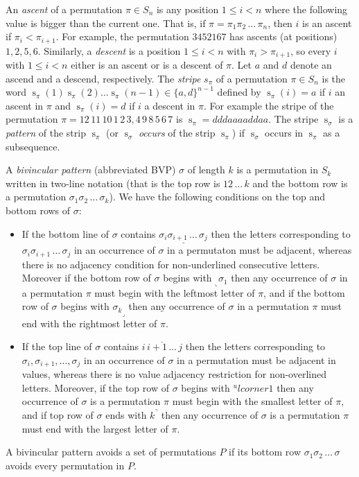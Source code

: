 \documentclass[a4paper]{llncs}
\DeclareMathOperator{\stripea}{s}
\newcommand{\stripe}[2]{\stripea_{{#1}}({#2})}
\newcommand{\stripew}[1]{\stripea_{{#1}}}
\newcommand{\dstep}{d}
\newcommand{\ustep}{a}
\begin{document}
An \emph{ascent} of a permutation $\pi \in S_n$ is any position 
$1 \leq i < n$ where the following value is bigger than the current one. 
That is, if $\pi = \pi_1\pi_2\,\ldots\,\pi_n$, then
$i$ is an ascent if $\pi_i < \pi_{i+1}$.
For example, the permutation 
$345216$7 has ascents (at positions) $1,2,5,6$.
Similarly, a \emph{descent} is a position 
$1 \leq i < n$ with $\pi_i > \pi_{i+1}$, 
so every $i$ with $1 \leq i < n$ either is an ascent or is a descent of 
$\pi$.
Let $\ustep$ and $\dstep$ denote an ascend and a descend, respectively.
The \emph{stripe} $s_\pi$ of a permutation $\pi \in S_n$ is the word
$\stripe{\pi}{1} \stripe{\pi}{2} \ldots \stripe{\pi}{n-1} \in \{\ustep,\dstep\}^{n-1}$ 
defined by 
$ \stripe{\pi}{i}= \ustep$ if $i$ an ascent in $\pi$ and
$\stripe{\pi}{i} = \dstep$ if $i$ a descent in $\pi$.
For example the stripe of the permutation 
$\pi = 12\,11\,10\,1\,2\,3,4\,9\,8\,5\,6\,7$ 
is 
$\stripew{\pi} = \dstep\dstep\dstep\ustep\ustep\ustep\ustep\dstep\dstep\ustep\ustep$.
The stripe $\stripew{\sigma}$ is a \emph{pattern} of the strip $\stripew{\pi}$
(or $\stripew{\sigma}$ \emph{occurs} of the strip $\stripew{\pi}$) if $\stripew{\sigma}$ occurs in
$\stripew{\pi}$ as a subsequence.
			
A \emph{bivincular pattern} (abbreviated BVP) $\sigma$
of length $k$ is a permutation in $S_k$ written in
two-line notation 
(that is the top row is $12\,\ldots\,k$ and the bottom row
is a permutation $\sigma_1\sigma_2\,\ldots\,\sigma_k$).
We have the following conditions on the top and bottom rows
of $\sigma$:
\begin{itemize}
	\item
	If the bottom line of $\sigma$ contains
	$\underline{\sigma_i\sigma_{i+1}\,\ldots\,\sigma_j}$
	then the letters corresponding to 
	$\sigma_i\sigma_{i+1}\,\ldots\,\sigma_j$ in an occurrence of
	$\sigma$ in a permutaton must be adjacent, whereas there is
	no adjacency condition for
	non-underlined consecutive letters.
	Moreover if the bottom row of $\sigma$ begins with
	$_\llcorner{\sigma_1}$ then any occurrence of $\sigma$ 
	in a permutation $\pi$ must begin with the leftmost 
	letter of $\pi$,
	and 
	if the bottom row of $\sigma$ begins with
	${\sigma_k}_\lrcorner$ then any occurrence of $\sigma$ 
	in a permutation $\pi$ must end with the rightmost 
	letter of $\pi$.
	\item
	If the top line of $\sigma$ contains
	$\overline{i\,i+1\,\ldots\,j}$ then the letters corresponding to
	$\sigma_i, \sigma_{i+1}, \ldots, \sigma_j$ in an
	occurrence of $\sigma$ in a permutation must be adjacent in values,
	whereas there is no value adjacency restriction for non-overlined 
	letters.
	Moreover, if the top row of $\sigma$ begins with
	$^ulcorner{1}$ then
	any occurrence of $\sigma$ is a permutation $\pi$ must begin with
	the smallest letter of $\pi$, and
	if top row of $\sigma$ ends with $k^\urcorner$ then
	any occurrence of $\sigma$ is a permutation $\pi$ must end with
	the largest letter of $\pi$.
\end{itemize}
A bivincular pattern avoids a set of permutations $P$ if its bottom
row $\sigma_1\sigma_2\,\ldots\,\sigma$ avoids every permutation in $P$.
\end{document}

